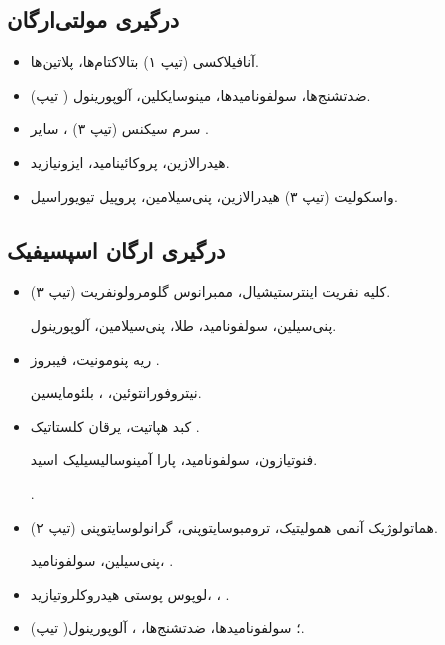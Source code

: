 \documentclass[12pt,a4paper]{article}
\begin{document}
\subsection*{درگیری مولتی‌ارگان}
\begin{itemize}
  \item آنافیلاکسی (تیپ ۱) \ADRarrow{} بتالاکتام‌ها، پلاتین‌ها.
  \item {} (تیپ ) \ADRarrow{}
  ضدتشنج‌ها، سولفونامیدها، مینوسایکلین، آلوپورینول.
  \item سرم سیکنس (تیپ ۳) \ADRarrow{} ، سایر .
  \item {} \ADRblank{} \ADRarrow{} هیدرالازین، پروکائینامید، ایزونیازید.
  \item واسکولیت (تیپ ۳) \ADRarrow{} هیدرالازین، پنی‌سیلامین، پروپیل تیویوراسیل.
\end{itemize}

\subsection*{درگیری ارگان اسپسیفیک}
\begin{itemize}
  \item کلیه \ADRarrow{} نفریت اینترستیشیال، ممبرانوس گلومرولونفریت (تیپ ۳).
  \par پنی‌سیلین، سولفونامید، طلا، پنی‌سیلامین، آلوپورینول.
  \item ریه \ADRarrow{} پنومونیت، فیبروز \ADRblank{}.
  \par نیتروفورانتوئین، ، بلئومایسین.
  \item کبد \ADRarrow{} هپاتیت، یرقان کلستاتیک \ADRblank{}.
  \par فنوتیازون، سولفونامید، پارا آمینوسالیسیلیک اسید.
  \par {}.
  \item هماتولوژیک \ADRarrow{} آنمی همولیتیک، ترومبوسایتوپنی، گرانولوسایتوپنی (تیپ ۲).
  \par پنی‌سیلین، سولفونامید، .
  \item لوپوس پوستی \ADRblank{} \ADRarrow{} هیدروکلروتیازید، ، .
  \item {} (تیپ )؛ 
  \ADRarrow{} سولفونامیدها، ضدتشنج‌ها، ، آلوپورینول.
\end{itemize}

\end{document}
